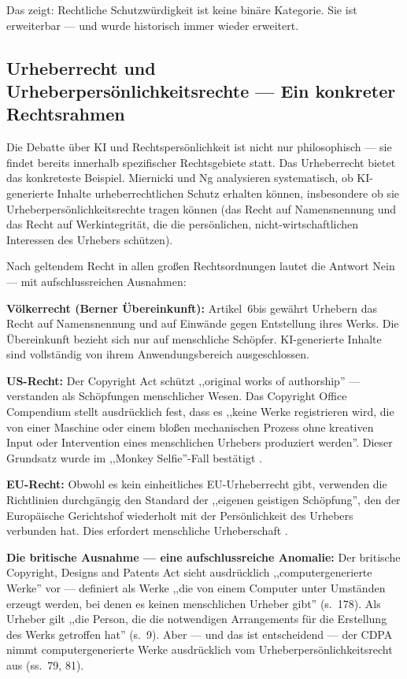 \documentclass[acmcp, nonacm]{acmart}
\begin{document}
Das zeigt: Rechtliche Schutzwürdigkeit ist keine binäre Kategorie. Sie ist erweiterbar --- und wurde historisch immer wieder erweitert.

\subsection{Urheberrecht und Urheberpersönlichkeitsrechte --- Ein konkreter Rechtsrahmen}

Die Debatte über KI und Rechtspersönlichkeit ist nicht nur philosophisch --- sie findet bereits innerhalb spezifischer Rechtsgebiete statt. Das Urheberrecht bietet das konkreteste Beispiel. Miernicki und Ng \cite{Miernicki2021} analysieren systematisch, ob KI-generierte Inhalte urheberrechtlichen Schutz erhalten können, insbesondere ob sie Urheberpersönlichkeitsrechte tragen können (das Recht auf Namensnennung und das Recht auf Werkintegrität, die die persönlichen, nicht-wirtschaftlichen Interessen des Urhebers schützen).

Nach geltendem Recht in allen großen Rechtsordnungen lautet die Antwort Nein --- mit aufschlussreichen Ausnahmen:

\noindent\textbf{Völkerrecht (Berner Übereinkunft):} Artikel~6bis gewährt Urhebern das Recht auf Namensnennung und auf Einwände gegen Entstellung ihres Werks. Die Übereinkunft bezieht sich nur auf menschliche Schöpfer. KI-generierte Inhalte sind vollständig von ihrem Anwendungsbereich ausgeschlossen.

\noindent\textbf{US-Recht:} Der Copyright Act schützt ,,original works of authorship'' --- verstanden als Schöpfungen menschlicher Wesen. Das Copyright Office Compendium stellt ausdrücklich fest, dass es ,,keine Werke registrieren wird, die von einer Maschine oder einem bloßen mechanischen Prozess ohne kreativen Input oder Intervention eines menschlichen Urhebers produziert werden''. Dieser Grundsatz wurde im ,,Monkey Selfie''-Fall bestätigt \cite{Naruto2016}.

\noindent\textbf{EU-Recht:} Obwohl es kein einheitliches EU-Urheberrecht gibt, verwenden die Richtlinien durchgängig den Standard der ,,eigenen geistigen Schöpfung'', den der Europäische Gerichtshof wiederholt mit der Persönlichkeit des Urhebers verbunden hat. Dies erfordert menschliche Urheberschaft \cite{Miernicki2021}.

\noindent\textbf{Die britische Ausnahme --- eine aufschlussreiche Anomalie:} Der britische Copyright, Designs and Patents Act \cite{UKCDPA1988} sieht ausdrücklich ,,computergenerierte Werke'' vor --- definiert als Werke ,,die von einem Computer unter Umständen erzeugt werden, bei denen es keinen menschlichen Urheber gibt'' (s.~178). Als Urheber gilt ,,die Person, die die notwendigen Arrangements für die Erstellung des Werks getroffen hat'' (s.~9). Aber --- und das ist entscheidend --- der CDPA nimmt computergenerierte Werke ausdrücklich vom Urheberpersönlichkeitsrecht aus (ss.~79, 81).
\end{document}
